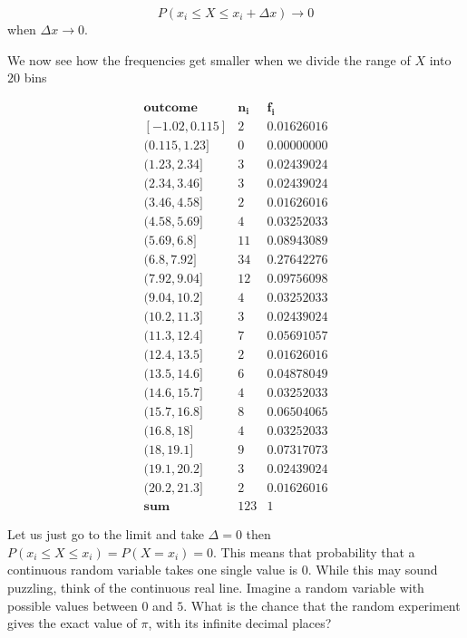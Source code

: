\documentclass[
]{book}
\begin{document}
\[P(x_i \leq X  \leq x_i + \Delta x) \rightarrow 0\] when \(\Delta x \rightarrow 0\).

We now see how the frequencies get smaller when we divide the range of \(X\) into \(20\) bins

\[
\begin{array}{ccc}
\mathbf{outcome} & \mathbf{n_i} & \mathbf{f_i} \\
\mathrm{[-1.02,0.115]}   &  2 & 0.01626016 \\
\mathrm{(0.115,1.23]}    &  0 & 0.00000000 \\
\mathrm{(1.23,2.34]}     &  3 & 0.02439024 \\
\mathrm{(2.34,3.46]}     &  3 & 0.02439024 \\
\mathrm{(3.46,4.58]}     &  2 & 0.01626016 \\
\mathrm{(4.58,5.69]}     &  4 & 0.03252033 \\
\mathrm{(5.69,6.8]}      & 11 & 0.08943089 \\
\mathrm{(6.8,7.92]}      & 34 & 0.27642276 \\
\mathrm{(7.92,9.04]}     & 12 & 0.09756098 \\
\mathrm{(9.04,10.2]}     &  4 & 0.03252033 \\
\mathrm{(10.2,11.3]}     &  3 & 0.02439024 \\
\mathrm{(11.3,12.4]}     &  7 & 0.05691057 \\
\mathrm{(12.4,13.5]}     &  2 & 0.01626016 \\
\mathrm{(13.5,14.6]}     &  6 & 0.04878049 \\
\mathrm{(14.6,15.7]}     &  4 & 0.03252033 \\
\mathrm{(15.7,16.8]}     &  8 & 0.06504065 \\
\mathrm{(16.8,18]}       &  4 & 0.03252033 \\
\mathrm{(18,19.1]}       &  9 & 0.07317073 \\
\mathrm{(19.1,20.2]}     &  3 & 0.02439024 \\
\mathrm{(20.2,21.3]}     &  2 & 0.01626016 \\ \hline
\mathbf{sum}    & 123 & 1
\end{array}
\]

Let us just go to the limit and take \(\Delta =0\) then \(P(x_i \leq X \leq x_i)=P(X=x_i)=0\). This means that probability that a continuous random variable takes one single value is \(0\). While this may sound puzzling, think of the continuous real line. Imagine a random variable with possible values between \(0\) and \(5\). What is the chance that the random experiment gives the exact value of \(\pi\), with its infinite decimal places?
\end{document}

